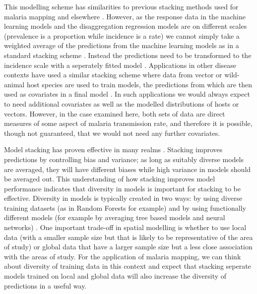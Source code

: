 \documentclass[review]{elsarticle}
\begin{document}
This modelling scheme has similarities to previous stacking methods used for malaria mapping \citep{bhatt2017improved} and elsewhere \citep{wolpert1992stacked, sill2009feature, hao2019review, breiman1996stacked}.
However, as the response data in the machine learning models and the disaggregation regression models are on different scales (prevalence is a proportion while incidence is a rate) we cannot simply take a weighted average of the predictions from the machine learning models as in a standard stacking scheme \citep{sill2009feature, hao2019review}.
Instead the predictions need to be transformed to the incidence scale with a seperately fitted model \citep{cameron2015defining}.
Applications in other disease contexts have used a similar stacking scheme where data from vector or wild-animal host species are used to train models, the predictions from which are then used as covariates in a final model \citep{pigott2014mapping, shearer2016estimating}.
In such applications we would always expect to need additional covariates as well as the modelled distributions of hosts or vectors.
However, in the case examined here, both sets of data are direct measures of some aspect of malaria transmission rate, and therefore it is possible, though not guaranteed, that we would not need any further covariates. 


Model stacking \citep{wolpert1992stacked} has proven effective in many realms \citep{bhatt2017improved, sill2009feature, hao2019review, breiman1996stacked}. 
Stacking improves predictions by controlling bias and variance; as long as suitably diverse models are averaged, they will have different biases while high variance in models should be averaged out.
This understanding of how stacking improves model performance indicates that diversity in models is important for stacking to be effective.
Diversity in models is typically created in two ways: by using diverse training datasets \citep{breiman1996bagging} (as in Random Forests for example) and by using functionally different models (for example by averaging tree based models and neural networks) \citep{breiman1996stacked}.
One important trade-off in spatial modelling is whether to use local data (with a smaller sample size but that is likely to be representative of the area of study) or global data that have a larger sample size but a less close association with the areas of study.
For the application of malaria mapping, we can think about diversity of training data in this context and expect that stacking seperate models trained on local and global data will also increase the diversity of predictions in a useful way.
\end{document}
